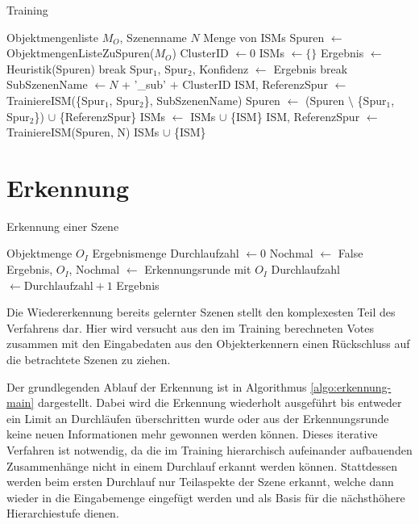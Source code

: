 \begin{algorithm}
  \caption{Training}
  \label{algo:training}
  \begin{algorithmic}[1]
    \Require Objektmengenliste $M_O$, Szenenname $N$\;
    \Ensure Menge von ISMs\;
    \State Spuren $\gets$ ObjektmengenListeZuSpuren($M_O$)\;
    \State ClusterID $\gets 0$\;
    \State ISMs $\gets \{ \}$\;
      \State Ergebnis $\gets$ Heuristik(Spuren)\;
          \State break\;
      \EndIf
      \State Spur$_1$, Spur$_2$, Konfidenz $\gets$ Ergebnis\;
          \State break\;
      \EndIf
      \State SubSzenenName $\gets N$ + '\_sub' $+$ ClusterID\;
      \State ISM, ReferenzSpur $\gets$ TrainiereISM(\{Spur$_1$, Spur$_2$\}, SubSzenenName)\;
      \State Spuren $\gets$ (Spuren $\setminus$ \{Spur$_1$, Spur$_2$\}) $\cup$ \{ReferenzSpur\}\;
      \State ISMs $\gets$ ISMs $\cup$ \{ISM\}\;
    \EndWhile
    \State ISM, ReferenzSpur $\gets$ TrainiereISM(Spuren, N)\;
    \State \Return ISMs $\cup$ \{ISM\}\;
  \end{algorithmic}
\end{algorithm}

\section{Erkennung}

\begin{algorithm}
  \caption{Erkennung einer Szene}
  \small\label{algo:erkennung-main}
  \begin{algorithmic}[1]
    \Require Objektmenge $O_I$\;
    \Ensure Ergebnismenge\;
    \State Durchlaufzahl $\gets 0$\;
    \State Nochmal $\gets$ False\;
    \Repeat
      \State Ergebnis, $O_I$, Nochmal $\gets$ Erkennungsrunde mit $O_I$\;
      \State Durchlaufzahl $\gets \text{Durchlaufzahl} + 1$\;
    \State \Return Ergebnis\;
  \end{algorithmic}
\end{algorithm}

Die Wiedererkennung bereits gelernter Szenen stellt den komplexesten Teil des Verfahrens dar.
Hier wird versucht aus den im Training berechneten Votes zusammen mit den Eingabedaten aus den Objekterkennern einen Rückschluss auf die betrachtete Szenen zu ziehen.

Der grundlegenden Ablauf der Erkennung ist in Algorithmus \vref{algo:erkennung-main} dargestellt.
Dabei wird die Erkennung wiederholt ausgeführt bis entweder ein Limit an Durchläufen überschritten wurde oder aus der Erkennungsrunde keine neuen Informationen mehr gewonnen werden können.
Dieses iterative Verfahren ist notwendig, da die im Training hierarchisch aufeinander aufbauenden Zusammenhänge nicht in einem Durchlauf erkannt werden können.
Stattdessen werden beim ersten Durchlauf nur Teilaspekte der Szene erkannt, welche dann wieder in die Eingabemenge eingefügt werden und als Basis für die nächsthöhere Hierarchiestufe dienen.

